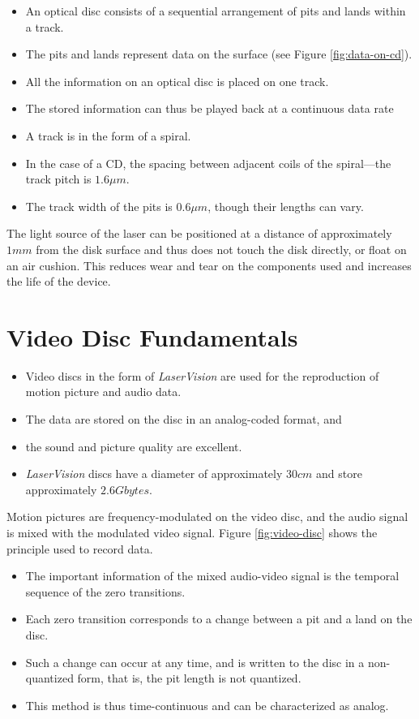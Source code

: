 \begin{multicols}{2}
	\begin{itemize}
		\item An optical disc consists of a sequential arrangement of pits and lands within a track. 
		\item The pits and lands represent data on the surface (see Figure {\ref{fig:data-on-cd}}).
		\item All the information on an optical disc is placed on one track. 
		\item The stored information can thus be played back at a continuous data rate
		\item A track is in the form of a spiral. 
		\item In the case of a CD, the spacing between adjacent coils of the spiral—the track pitch is $ 1.6 \mu m$. 
		\item The track width of the pits is $ 0.6 \mu m $, though their lengths can vary. 
	\end{itemize}
\end{multicols}

The light source of the laser can be positioned at a distance of approximately $ 1 mm $ from the disk surface and thus does not touch the disk directly, or float on an air cushion. This reduces wear and tear on the components used and increases the life of the device.

\section{Video Disc Fundamentals}
\begin{itemize}
	\item Video discs in the form of \textit{LaserVision} are used for the reproduction of motion picture and audio data. 
	\item The data are stored on the disc in an analog-coded format, and
	\item the sound and picture quality are excellent. 
	\item \textit{LaserVision} discs have a diameter of approximately $ 30cm $ and store approximately $ 2.6Gbytes $.
\end{itemize}


Motion pictures are frequency-modulated on the video disc, and the audio signal is mixed with the modulated video signal. Figure {\ref{fig:video-disc}} shows the principle used to record data. 
\begin{itemize}
	\item The important information of the mixed audio-video signal is the temporal	sequence of the zero transitions. 
	\item Each zero transition corresponds to a change between a pit and a land on the disc.
	\item Such a change can occur at any time, and is written to the disc in a non-quantized form, that is, the pit length is not quantized. 
	\item This method is thus time-continuous and can be characterized as analog.
\end{itemize}


